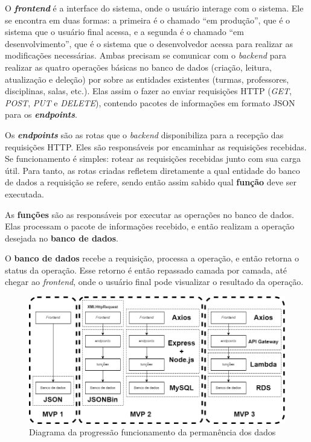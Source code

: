 O \textbf{\textit{frontend}} é a interface do sistema, onde o usuário interage com o sistema. Ele se encontra em duas formas: a primeira é o chamado ``em produção'', que é o sistema que o usuário final acessa, e a segunda é o chamado ``em desenvolvimento'', que é o sistema que o desenvolvedor acessa para realizar as modificações necessárias. Ambas precisam se comunicar com o \textit{backend} para realizar as quatro operações básicas no banco de dados (criação, leitura, atualização e deleção) por sobre as entidades existentes (turmas, professores, disciplinas, salas, etc.). Elas assim o fazer ao enviar requisições HTTP (\textit{GET}, \textit{POST}, \textit{PUT} e \textit{DELETE}), contendo pacotes de informações em formato JSON para os \textbf{\textit{endpoints}}.

Os \textbf{\textit{endpoints}} são as rotas que o \textit{backend} disponibiliza para a recepção das requisições HTTP. Eles são responsáveis por encaminhar as requisições recebidas. Se funcionamento é simples: rotear as requisições recebidas junto com sua carga útil. Para tanto, as rotas criadas refletem diretamente a qual entidade do banco de dados a requisição se refere, sendo então assim sabido qual \textbf{função} deve ser executada.

As \textbf{funções} são as responsáveis por executar as operações no banco de dados. Elas processam o pacote de informações recebido, e então realizam a operação desejada no \textbf{banco de dados}.

O \textbf{banco de dados} recebe a requisição, processa a operação, e então retorna o status da operação. Esse retorno é então repassado camada por camada, até chegar ao \textit{frontend}, onde o usuário final pode visualizar o resultado da operação.


\begin{figure}[htbp]
  \centering
  \caption{Diagrama da progressão funcionamento da permanência dos dados\label{fig:API}}
  \includegraphics[scale=0.5]{files/img/Codificacao/API - com diagrama.png}
  \legend{\selfAuthor}
\end{figure}

